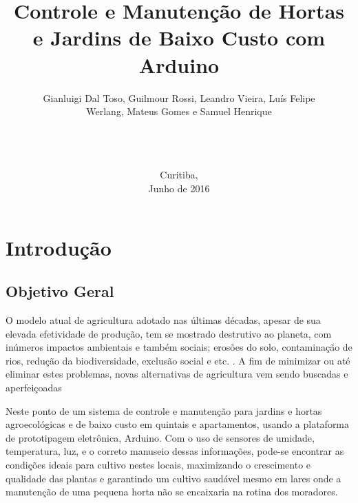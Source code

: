 \documentclass[a4paper,12pt]{article}
\begin{document}
\title{Controle e Manutenção de Hortas e Jardins de Baixo Custo com Arduino}
\author{Gianluigi Dal Toso, Guilmour Rossi, Leandro Vieira, Luís Felipe\\Werlang, Mateus Gomes e Samuel Henrique\\\texttt{}\\\\\\
}

\date{Curitiba, \\Junho de 2016}

\maketitle

\newpage


\tableofcontents


\newpage

\listoffigures

\newpage

\listoftables

\makenomenclature

\newpage
\section{Introdução}

\subsection{Objetivo Geral}
O modelo atual de agricultura adotado nas últimas décadas, apesar de sua elevada efetividade de produção, tem se mostrado destrutivo ao planeta, com inúmeros impactos ambientais e também sociais; erosões do solo, contaminação de rios, redução da biodiversidade, exclusão social e etc. \cite[p.~23]{medeiros}. A fim de minimizar ou até eliminar estes problemas, novas alternativas de agricultura vem sendo buscadas e aperfeiçoadas

Neste ponto  de um sistema de controle e manutenção para jardins e hortas agroecológicas e de baixo custo em quintais e apartamentos, usando a plataforma de prototipagem eletrônica, Arduino. Com o uso de sensores de umidade, temperatura, luz, e o correto manuseio dessas informações, pode-se encontrar as condições ideais para cultivo nestes locais, maximizando o crescimento e qualidade das plantas e garantindo um cultivo saudável mesmo em lares onde a manutenção de uma pequena horta não se encaixaria na rotina dos moradores.
\end{document}
